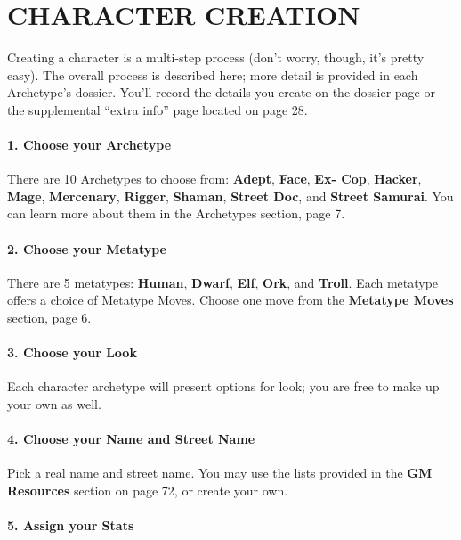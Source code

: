 \documentclass[oneside,10pt]{article}
\begin{document}
\section{CHARACTER CREATION}
\begin{multicols}{2}

Creating a character is a multi-step process (don’t worry,
though, it’s pretty easy). The overall process is described
here; more detail is provided in each Archetype’s dossier.
You’ll record the details you create on the dossier page or the
supplemental “extra info” page located on page 28.

\paragraph{1.  Choose your Archetype}

There are 10 Archetypes to choose from: \textbf{Adept}, \textbf{Face}, \textbf{Ex-
Cop}, \textbf{Hacker}, \textbf{Mage}, \textbf{Mercenary}, \textbf{Rigger}, \textbf{Shaman}, \textbf{Street
Doc}, and \textbf{Street Samurai}. You can learn more about them in
the Archetypes section, page 7.

\paragraph{2.  Choose your Metatype}

There are 5 metatypes: \textbf{Human}, \textbf{Dwarf}, \textbf{Elf}, \textbf{Ork}, and \textbf{Troll}.
Each metatype offers a choice of Metatype Moves. Choose
one move from the \textbf{Metatype Moves} section, page 6.

\paragraph{3.  Choose your Look}

Each character archetype will present options for look; you
are free to make up your own as well.

\paragraph{4.  Choose your Name and Street Name}

Pick a real name and street name. You may use the lists provided in the \textbf{GM Resources} section on page 72, or create
your own.

\paragraph{5.  Assign your Stats}


\end{multicols}
\end{document}

